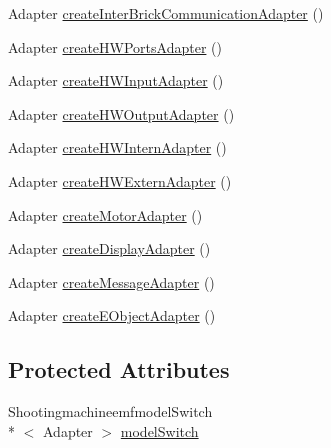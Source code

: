 \begin{DoxyCompactItemize}
\item 
Adapter \hyperlink{classshootingmachineemfmodel_1_1util_1_1_shootingmachineemfmodel_adapter_factory_a3bb927290e750f4f349138e9df052a60}{create\-Inter\-Brick\-Communication\-Adapter} ()
\item 
Adapter \hyperlink{classshootingmachineemfmodel_1_1util_1_1_shootingmachineemfmodel_adapter_factory_a9e84c8541d06ca7e8b696fed64c4655d}{create\-H\-W\-Ports\-Adapter} ()
\item 
Adapter \hyperlink{classshootingmachineemfmodel_1_1util_1_1_shootingmachineemfmodel_adapter_factory_a9733ce81f4e1bac464994534e5b26859}{create\-H\-W\-Input\-Adapter} ()
\item 
Adapter \hyperlink{classshootingmachineemfmodel_1_1util_1_1_shootingmachineemfmodel_adapter_factory_abcd80694cbc94015f4a74e46c59b2707}{create\-H\-W\-Output\-Adapter} ()
\item 
Adapter \hyperlink{classshootingmachineemfmodel_1_1util_1_1_shootingmachineemfmodel_adapter_factory_a2d0bc4a81aaacd68155023b3356e96eb}{create\-H\-W\-Intern\-Adapter} ()
\item 
Adapter \hyperlink{classshootingmachineemfmodel_1_1util_1_1_shootingmachineemfmodel_adapter_factory_a01982ee27ddce7c007f520b4b1d618fa}{create\-H\-W\-Extern\-Adapter} ()
\item 
Adapter \hyperlink{classshootingmachineemfmodel_1_1util_1_1_shootingmachineemfmodel_adapter_factory_aea17914b6a42f71419c578bb0f6bee32}{create\-Motor\-Adapter} ()
\item 
Adapter \hyperlink{classshootingmachineemfmodel_1_1util_1_1_shootingmachineemfmodel_adapter_factory_ae0d1d51f8af3b70b629962ceaca9c0ba}{create\-Display\-Adapter} ()
\item 
Adapter \hyperlink{classshootingmachineemfmodel_1_1util_1_1_shootingmachineemfmodel_adapter_factory_adc06f986d558f993983f3efea49b8752}{create\-Message\-Adapter} ()
\item 
Adapter \hyperlink{classshootingmachineemfmodel_1_1util_1_1_shootingmachineemfmodel_adapter_factory_a7b3f7cf3dadf2268987491f8d16d0b98}{create\-E\-Object\-Adapter} ()
\end{DoxyCompactItemize}
\subsection*{Protected Attributes}
\begin{DoxyCompactItemize}
\item 
Shootingmachineemfmodel\-Switch\\*
$<$ Adapter $>$ \hyperlink{classshootingmachineemfmodel_1_1util_1_1_shootingmachineemfmodel_adapter_factory_a38181f18235dbfb227e4bc5d1debe435}{model\-Switch}
\end{DoxyCompactItemize}
